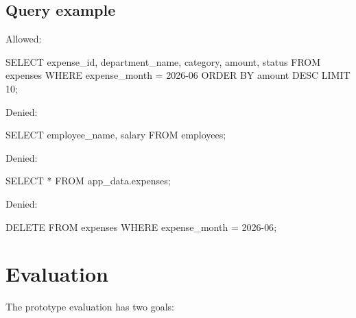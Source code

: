 \documentclass[journal]{IEEEtran}
\newenvironment{Shaded}{}{}
\newcommand{\DecValTok}[1]{\textcolor[rgb]{0.25,0.63,0.44}{#1}}
\newcommand{\KeywordTok}[1]{\textcolor[rgb]{0.00,0.44,0.13}{#1}}
\newcommand{\NormalTok}[1]{#1}
\newcommand{\OperatorTok}[1]{\textcolor[rgb]{0.40,0.40,0.40}{#1}}
\newcommand{\StringTok}[1]{\textcolor[rgb]{0.25,0.44,0.63}{#1}}
\begin{document}
\hypertarget{query-example}{%
\subsection{Query example}\label{query-example}}

Allowed:

\begin{Shaded}
\begin{Highlighting}[]
\KeywordTok{SELECT}\NormalTok{ expense\_id, department\_name, category, amount, status}
\KeywordTok{FROM}\NormalTok{ expenses}
\KeywordTok{WHERE}\NormalTok{ expense\_month }\OperatorTok{=} \StringTok{\textquotesingle{}2026{-}06\textquotesingle{}}
\KeywordTok{ORDER} \KeywordTok{BY}\NormalTok{ amount }\KeywordTok{DESC}
\KeywordTok{LIMIT} \DecValTok{10}\NormalTok{;}
\end{Highlighting}
\end{Shaded}

Denied:

\begin{Shaded}
\begin{Highlighting}[]
\KeywordTok{SELECT}\NormalTok{ employee\_name, salary }\KeywordTok{FROM}\NormalTok{ employees;}
\end{Highlighting}
\end{Shaded}

Denied:

\begin{Shaded}
\begin{Highlighting}[]
\KeywordTok{SELECT} \OperatorTok{*} \KeywordTok{FROM}\NormalTok{ app\_data.expenses;}
\end{Highlighting}
\end{Shaded}

Denied:

\begin{Shaded}
\begin{Highlighting}[]
\KeywordTok{DELETE} \KeywordTok{FROM}\NormalTok{ expenses }\KeywordTok{WHERE}\NormalTok{ expense\_month }\OperatorTok{=} \StringTok{\textquotesingle{}2026{-}06\textquotesingle{}}\NormalTok{;}
\end{Highlighting}
\end{Shaded}


\hypertarget{evaluation}{%
\section{Evaluation}\label{evaluation}}

The prototype evaluation has two goals:
\end{document}
